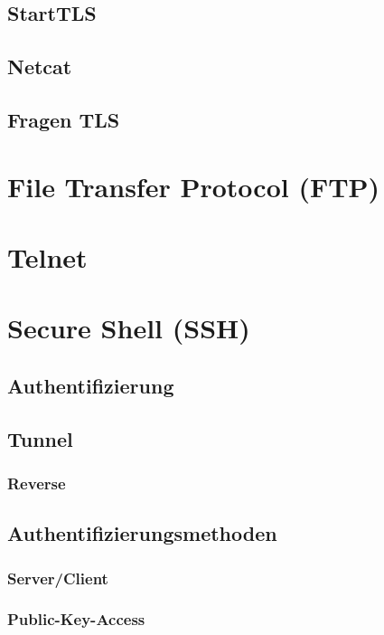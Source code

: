 \subsection{StartTLS}
\subsection{Netcat}
\subsection{Fragen TLS}

\section{File Transfer Protocol (FTP)}
\section{Telnet}

\section{Secure Shell (SSH)}

\subsection{Authentifizierung}
\subsection{Tunnel}
\subsubsection*{Reverse}
\subsection{Authentifizierungsmethoden}
\subsubsection{Server/Client}
\subsubsection{Public-Key-Access}
